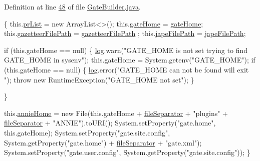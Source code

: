 Definition at line \hyperlink{L48}{48} of file \hyperlink{}{Gate\-Builder.\-java}.


\begin{DoxyCode}
                                 \{
        this.\hyperlink{classcom_1_1poly_1_1nlp_1_1filekommander_1_1gate_1_1_gate_builder_a4e56ddc3afefb48e751266e1e6449b7f}{prList} = \textcolor{keyword}{new} ArrayList<>();
        this.\hyperlink{classcom_1_1poly_1_1nlp_1_1filekommander_1_1gate_1_1_gate_builder_abdefcfc6edae8b7edf26f0381ed9da34}{gateHome} = \hyperlink{classcom_1_1poly_1_1nlp_1_1filekommander_1_1gate_1_1_gate_builder_abdefcfc6edae8b7edf26f0381ed9da34}{gateHome};
        this.\hyperlink{classcom_1_1poly_1_1nlp_1_1filekommander_1_1gate_1_1_gate_builder_adceaef80d20a83bd8c1cded83b90a692}{gazetteerFilePath} = \hyperlink{classcom_1_1poly_1_1nlp_1_1filekommander_1_1gate_1_1_gate_builder_adceaef80d20a83bd8c1cded83b90a692}{gazetteerFilePath}
      ;
        this.\hyperlink{classcom_1_1poly_1_1nlp_1_1filekommander_1_1gate_1_1_gate_builder_a58783e8638545aa5ea65a89aa1061dde}{japeFilePath} = \hyperlink{classcom_1_1poly_1_1nlp_1_1filekommander_1_1gate_1_1_gate_builder_a58783e8638545aa5ea65a89aa1061dde}{japeFilePath};

        \textcolor{keywordflow}{if} (this.gateHome == null) \{
            \hyperlink{classcom_1_1poly_1_1nlp_1_1filekommander_1_1gate_1_1_gate_builder_abbd1c14bf5a3ef4f39d4563dd498c467}{log}.warn(\textcolor{stringliteral}{"GATE\_HOME is not set trying to find GATE\_HOME in
       sysenv"});
            this.gateHome = System.getenv(\textcolor{stringliteral}{"GATE\_HOME"});
            \textcolor{keywordflow}{if} (this.gateHome == null) \{
                \hyperlink{classcom_1_1poly_1_1nlp_1_1filekommander_1_1gate_1_1_gate_builder_abbd1c14bf5a3ef4f39d4563dd498c467}{log}.error(\textcolor{stringliteral}{"GATE\_HOME can not be found will exit "});
                \textcolor{keywordflow}{throw} \textcolor{keyword}{new} RuntimeException(\textcolor{stringliteral}{"GATE\_HOME not set"});
            \}

        \}

        this.\hyperlink{classcom_1_1poly_1_1nlp_1_1filekommander_1_1gate_1_1_gate_builder_a4f34ff5f89a6a8a2ddcc72935cb6f51d}{annieHome} = \textcolor{keyword}{new} File(this.gateHome + \hyperlink{classcom_1_1poly_1_1nlp_1_1filekommander_1_1gate_1_1_gate_builder_aca691fb8ad715fd61ccf5845647c7bf2}{fileSeparator}
       + \textcolor{stringliteral}{"plugins"}
                + \hyperlink{classcom_1_1poly_1_1nlp_1_1filekommander_1_1gate_1_1_gate_builder_aca691fb8ad715fd61ccf5845647c7bf2}{fileSeparator} + \textcolor{stringliteral}{"ANNIE"}).toURI();
        System.setProperty(\textcolor{stringliteral}{"gate.home"}, this.gateHome);
        System.setProperty(\textcolor{stringliteral}{"gate.site.config"}, System.getProperty(\textcolor{stringliteral}{"gate.home"})
                + \hyperlink{classcom_1_1poly_1_1nlp_1_1filekommander_1_1gate_1_1_gate_builder_aca691fb8ad715fd61ccf5845647c7bf2}{fileSeparator} + \textcolor{stringliteral}{"gate.xml"});
        System.setProperty(\textcolor{stringliteral}{"gate.user.config"},
                System.getProperty(\textcolor{stringliteral}{"gate.site.config"}));
    \}
\end{DoxyCode}


